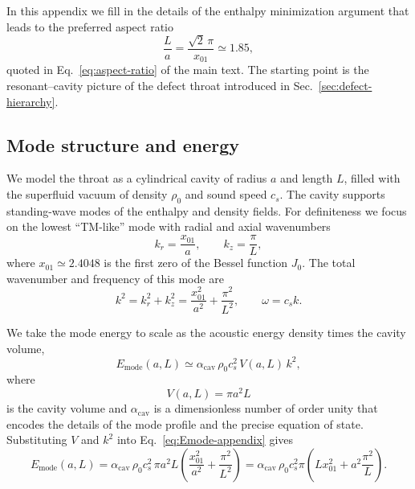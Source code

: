 \documentclass[11pt]{article}
\newcommand{\acav}{\alpha_{\mathrm{cav}}}
\begin{document}
In this appendix we fill in the details of the enthalpy minimization argument that leads to the preferred aspect ratio
\begin{equation}
\frac{L}{a} = \frac{\sqrt{2}\,\pi}{x_{01}}
\simeq 1.85,
\end{equation}
quoted in Eq.~\eqref{eq:aspect-ratio} of the main text.  The starting point is the resonant--cavity picture of the defect throat introduced in Sec.~\ref{sec:defect-hierarchy}.

\subsection{Mode structure and energy}

We model the throat as a cylindrical cavity of radius $a$ and length $L$, filled with the superfluid vacuum of density $\rho_0$ and sound speed $c_s$.  The cavity supports standing-wave modes of the enthalpy and density fields.  For definiteness we focus on the lowest ``TM-like'' mode with radial and axial wavenumbers
\begin{equation}
k_r = \frac{x_{01}}{a},\qquad
k_z = \frac{\pi}{L},
\end{equation}
where $x_{01} \simeq 2.4048$ is the first zero of the Bessel function $J_0$.  The total wavenumber and frequency of this mode are
\begin{equation}
k^2 = k_r^2 + k_z^2
= \frac{x_{01}^2}{a^2} + \frac{\pi^2}{L^2},
\qquad
\omega = c_s k.
\end{equation}

We take the mode energy to scale as the acoustic energy density times the cavity volume,
\begin{equation}
E_{\mathrm{mode}}(a,L)
\simeq \acav\,\rho_0 c_s^2\,V(a,L)\,k^2,
\label{eq:Emode-appendix}
\end{equation}
where
\begin{equation}
V(a,L) = \pi a^2 L
\end{equation}
is the cavity volume and $\acav$ is a dimensionless number of order unity that encodes the details of the mode profile and the precise equation of state.  Substituting $V$ and $k^2$ into Eq.~\eqref{eq:Emode-appendix} gives
\begin{equation}
E_{\mathrm{mode}}(a,L)
= \acav\,\rho_0 c_s^2\,\pi a^2 L
\left(\frac{x_{01}^2}{a^2} + \frac{\pi^2}{L^2}\right)
= \acav\,\rho_0 c_s^2 \pi
\left(L x_{01}^2 + a^2 \frac{\pi^2}{L}\right).
\label{eq:Emode-simplified}
\end{equation}
\end{document}
